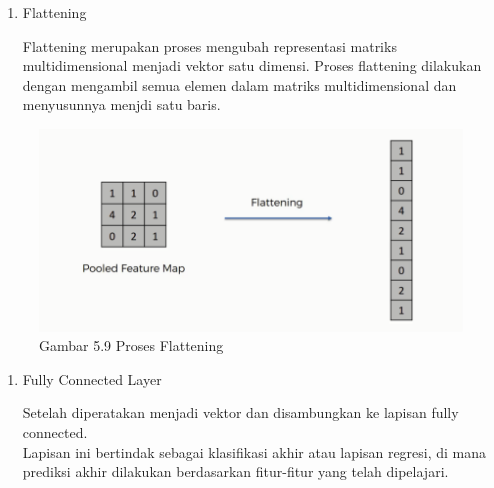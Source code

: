 \documentclass[
  letterpaper,
  DIV=11,
  numbers=noendperiod]{scrreprt}
\begin{document}
\begin{enumerate}
\def\labelenumi{\alph{enumi})}
\setcounter{enumi}{2}
\item
  Flattening

  Flattening merupakan proses mengubah representasi matriks
  multidimensional menjadi vektor satu dimensi. Proses flattening
  dilakukan dengan mengambil semua elemen dalam matriks multidimensional
  dan menyusunnya menjdi satu baris.
\end{enumerate}

\begin{figure}

{\centering \includegraphics{Asset/flatening.png}

}

\caption{Gambar 5.9 Proses Flattening}

\end{figure}

\begin{enumerate}
\def\labelenumi{\alph{enumi})}
\setcounter{enumi}{3}
\item
  Fully Connected Layer

  Setelah diperatakan menjadi vektor dan disambungkan ke lapisan fully
  connected.\\
  Lapisan ini bertindak sebagai klasifikasi akhir atau lapisan regresi,
  di mana prediksi akhir dilakukan berdasarkan fitur-fitur yang telah
  dipelajari.
\end{enumerate}
\end{document}
